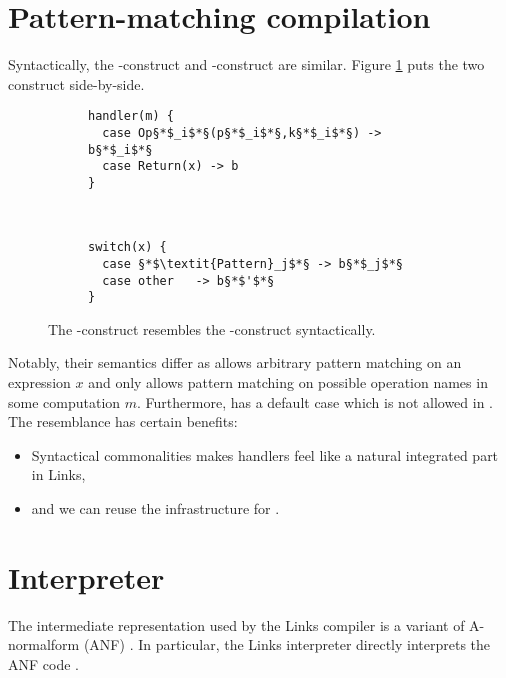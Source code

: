 \section{Pattern-matching compilation}
Syntactically, the -construct and -construct are similar. Figure \ref{fig:handler-switch} puts the two construct side-by-side.
\begin{figure}[h]
    \centering
    \begin{subfigure}[c]{0.45\textwidth}
        \centering
\begin{lstlisting}[style=links]
handler(m) {
  case Op§*$_i$*§(p§*$_i$*§,k§*$_i$*§) -> b§*$_i$*§
  case Return(x) -> b
}
\end{lstlisting}        
    \end{subfigure}%
    ~
    \begin{subfigure}[c]{0.45\textwidth}
        \centering
\begin{lstlisting}[style=links]
switch(x) {
  case §*$\textit{Pattern}_j$*§ -> b§*$_j$*§
  case other   -> b§*$'$*§
}
\end{lstlisting}       
    \end{subfigure}
\caption{The -construct resembles the -construct syntactically.}\label{fig:handler-switch}
\end{figure}
Notably, their semantics differ as  allows arbitrary pattern matching on an expression $x$ and  only allows pattern matching on possible operation names in some computation $m$. Furthermore,  has a default case  which is not allowed in . The resemblance has certain benefits:
\begin{itemize}
  \item Syntactical commonalities makes handlers feel like a natural integrated part in Links,
  \item and we can reuse the  infrastructure for .
\end{itemize}

\section{Interpreter}
The intermediate representation used by the Links compiler is a variant of A-normalform (ANF) \cite{Flanagan1993}. In particular, the Links interpreter directly interprets the ANF code \cite{Lindley2012}.